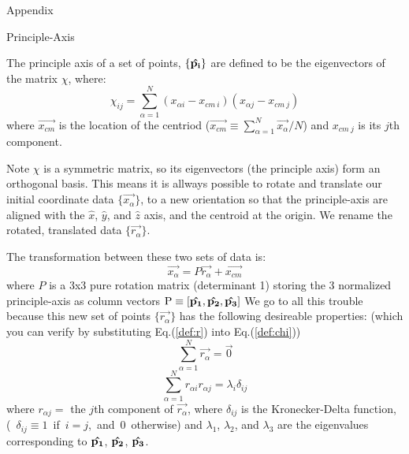 \begin{appendix}{Appendix}
\begin{center}
Principle-Axis
\end{center}

  The principle axis of a set of points, $\{ {\bf \hat{p_i}} \}$
are defined to be the eigenvectors of the matrix $\chi$, where:
\begin{equation}
\chi_{i j} = 
\sum_{\alpha=1}^N 
(x_{\alpha i} - x_{cm \ i})(x_{\alpha j} - x_{cm \ j})  \label{def:chi}
\end{equation}
where $\vec{x_{cm}}$ is the location of the centriod
\mbox{($ \vec{x_{cm}} \equiv \sum_{\alpha=1}^N \vec{x_\alpha}/N $)}
and $x_{cm \ j}$ is its $j$th component.

Note $\chi$ is a symmetric matrix, so its eigenvectors
(the principle axis) form an orthogonal basis.
This means it is allways possible to rotate and
translate our initial coordinate data
$\{ \vec{x_\alpha} \}$, to a new orientation
so that the principle-axis are aligned with the
$\hat{x}$, $\hat{y}$, and $\hat{z}$ axis,
and the centroid at the origin.
We rename the rotated, translated data  $\{ \vec{r_\alpha} \}$.

The transformation between these two sets of data is:
\begin{equation}
\vec{x_\alpha} =
P \vec{r_\alpha} + \vec{x_{cm}} \label{def:r}
\end{equation}
where $P$ is a 3x3 pure rotation matrix (determinant 1)
storing the 3 normalized principle-axis as column vectors
$
{\mbox
P \equiv
\left[
{\bf \hat{p_1}}, {\bf \hat{p_2}}, {\bf \hat{p_3}}
\right]
}
$
  We go to all this trouble because
this new set of points
$\{ \vec{r_\alpha} \}$
has the following desireable properties:
(which you can verify by substituting
 Eq.(\ref{def:r}) into Eq.(\ref{def:chi}))
\begin{equation}
\sum_{\alpha=1}^N \vec{r_\alpha}
  = \vec{0} \label{eq:property_centroid_aligned}
\end{equation}
\begin{equation}
\sum_{\alpha=1}^N r_{\alpha i} r_{\alpha j}
  = \lambda_i \delta_{i j} \label{eq:property_principle_axis_aligned}
\end{equation}
where $r_{\alpha j} = $ the $j$th component of $\vec{r_\alpha}$,
where $\delta_{i j}$ is the Kronecker-Delta function,
(\mbox{ $\delta_{i j} \equiv 1$ if $i = j$, and $0$ otherwise})
and $\lambda_1$, $\lambda_2$, and $\lambda_3$
are the eigenvalues corresponding to 
${\bf \hat{p_1}}$, ${\bf \hat{p_2}}$, ${\bf \hat{p_3}}$.


\end{appendix}
